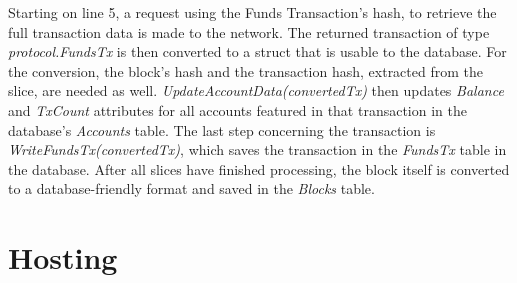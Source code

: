 Starting on line 5, a request using the Funds Transaction's hash, to retrieve the full transaction data is made to the network. The returned transaction of type \emph{protocol.FundsTx} is then converted to a struct that is usable to the database. For the conversion, the block's hash and the transaction hash, extracted from the slice, are needed as well. \emph{UpdateAccountData(convertedTx)} then updates \emph{Balance} and \emph{TxCount} attributes for all accounts featured in that transaction in the database's \emph{Accounts} table. The last step concerning the transaction is \emph{WriteFundsTx(convertedTx)}, which saves the transaction in the \emph{FundsTx} table in the database. After all slices have finished processing, the block itself is converted to a database-friendly format and saved in the \emph{Blocks} table.

\section{Hosting}